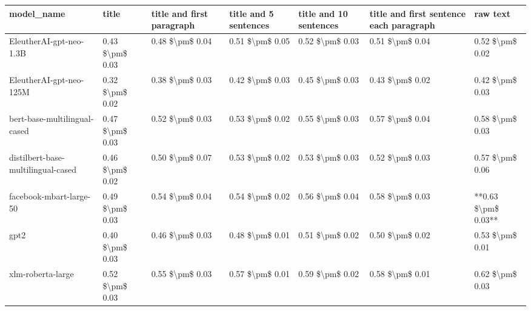 \begin{tabular}{lllllll}
\toprule
                        model\_name &           title & title and first paragraph & title and 5 sentences & title and 10 sentences & title and first sentence each paragraph &            raw text \\
\midrule
           EleutherAI-gpt-neo-1.3B & 0.43 \$\textbackslash pm\$ 0.03 &           0.48 \$\textbackslash pm\$ 0.04 &       0.51 \$\textbackslash pm\$ 0.05 &        0.52 \$\textbackslash pm\$ 0.03 &                         0.51 \$\textbackslash pm\$ 0.04 &     0.52 \$\textbackslash pm\$ 0.02 \\
           EleutherAI-gpt-neo-125M & 0.32 \$\textbackslash pm\$ 0.02 &           0.38 \$\textbackslash pm\$ 0.03 &       0.42 \$\textbackslash pm\$ 0.03 &        0.45 \$\textbackslash pm\$ 0.03 &                         0.43 \$\textbackslash pm\$ 0.02 &     0.42 \$\textbackslash pm\$ 0.03 \\
      bert-base-multilingual-cased & 0.47 \$\textbackslash pm\$ 0.03 &           0.52 \$\textbackslash pm\$ 0.03 &       0.53 \$\textbackslash pm\$ 0.02 &        0.55 \$\textbackslash pm\$ 0.03 &                         0.57 \$\textbackslash pm\$ 0.04 &     0.58 \$\textbackslash pm\$ 0.03 \\
distilbert-base-multilingual-cased & 0.46 \$\textbackslash pm\$ 0.02 &           0.50 \$\textbackslash pm\$ 0.07 &       0.53 \$\textbackslash pm\$ 0.02 &        0.53 \$\textbackslash pm\$ 0.03 &                         0.52 \$\textbackslash pm\$ 0.03 &     0.57 \$\textbackslash pm\$ 0.06 \\
           facebook-mbart-large-50 & 0.49 \$\textbackslash pm\$ 0.03 &           0.54 \$\textbackslash pm\$ 0.04 &       0.54 \$\textbackslash pm\$ 0.02 &        0.56 \$\textbackslash pm\$ 0.04 &                         0.58 \$\textbackslash pm\$ 0.03 & **0.63 \$\textbackslash pm\$ 0.03** \\
                              gpt2 & 0.40 \$\textbackslash pm\$ 0.03 &           0.46 \$\textbackslash pm\$ 0.03 &       0.48 \$\textbackslash pm\$ 0.01 &        0.51 \$\textbackslash pm\$ 0.02 &                         0.50 \$\textbackslash pm\$ 0.02 &     0.53 \$\textbackslash pm\$ 0.01 \\
                 xlm-roberta-large & 0.52 \$\textbackslash pm\$ 0.03 &           0.55 \$\textbackslash pm\$ 0.03 &       0.57 \$\textbackslash pm\$ 0.01 &        0.59 \$\textbackslash pm\$ 0.02 &                         0.58 \$\textbackslash pm\$ 0.01 &     0.62 \$\textbackslash pm\$ 0.03 \\
\bottomrule
\end{tabular}
